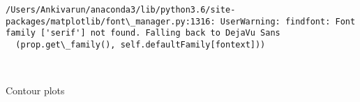 \documentclass[11pt]{article}
\begin{document}
    \begin{Verbatim}[commandchars=\\\{\}]
/Users/Ankivarun/anaconda3/lib/python3.6/site-packages/matplotlib/font\_manager.py:1316: UserWarning: findfont: Font family ['serif'] not found. Falling back to DejaVu Sans
  (prop.get\_family(), self.defaultFamily[fontext]))

    \end{Verbatim}

    \begin{center}
    \end{center}
    { \hspace*{\fill} \\}
    
    Contour plots
\end{document}
